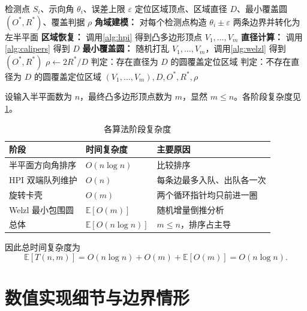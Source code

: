 \documentclass[UTF8,12pt,a4paper]{ctexart}
\theoremstyle{definition}
\newcommand{\eps}{\varepsilon}
\newcommand{\abs}[1]{\left\lvert #1\right\rvert}
\begin{document}
\begin{algorithm}[htbp]
\caption{定位区域直径与覆盖性判定的完整算法}
\label{alg:full}
\begin{algorithmic}[1]
\Require 检测点 $S_i$、示向角 $\theta_i$、误差上限 $\eps$
\Ensure 定位区域顶点、区域直径 $D$、最小覆盖圆 $(O^*,R^*)$、覆盖判据 $\rho$
\State \textbf{角域建模：} 对每个检测点构造 $\theta_i\pm\eps$ 两条边界并转化为左半平面
\State \textbf{区域恢复：} 调用\cref{alg:hpi} 得到凸多边形顶点 $V_1,\ldots,V_m$
\State \textbf{直径计算：} 调用\cref{alg:calipers} 得到 $D$
\State \textbf{最小覆盖圆：} 随机打乱 $V_1,\ldots,V_m$，调用\cref{alg:welzl} 得到 $(O^*,R^*)$
\State $\rho\gets 2R^*/D$
\If{$\abs{\rho-1}\le\eps_{\rm num}$}
    \State 判定：存在直径为 $D$ 的圆覆盖定位区域
\Else
    \State 判定：不存在直径为 $D$ 的圆覆盖定位区域
\EndIf
\State \Return $(V_1,\ldots,V_m),D,O^*,R^*,\rho$
\end{algorithmic}
\end{algorithm}

设输入半平面数为 $n$，最终凸多边形顶点数为 $m$，显然 $m\le n$。各阶段复杂度见\cref{tab:complexity}。

\begin{table}[htbp]
\centering
\caption{各算法阶段复杂度}
\label{tab:complexity}
\begin{tabular}{lll}
\toprule
阶段 & 时间复杂度 & 主要原因 \\
\midrule
半平面方向角排序 & $O(n\log n)$ & 比较排序 \\
HPI 双端队列维护 & $O(n)$ & 每条边最多入队、出队各一次 \\
旋转卡壳 & $O(m)$ & 两个循环指针均只前进一圈 \\
Welzl 最小包围圆 & $\mathbb E[O(m)]$ & 随机增量倒推分析 \\
\midrule
总体 & $\boxed{\mathbb E[O(n\log n)]}$ & $m\le n$，排序占主导 \\
\bottomrule
\end{tabular}
\end{table}

因此总时间复杂度为
\begin{equation}
\boxed{
\mathbb E[T(n,m)]
=O(n\log n)+O(m)+\mathbb E[O(m)]
=O(n\log n).
}
\end{equation}

\section{数值实现细节与边界情形}
\end{document}
